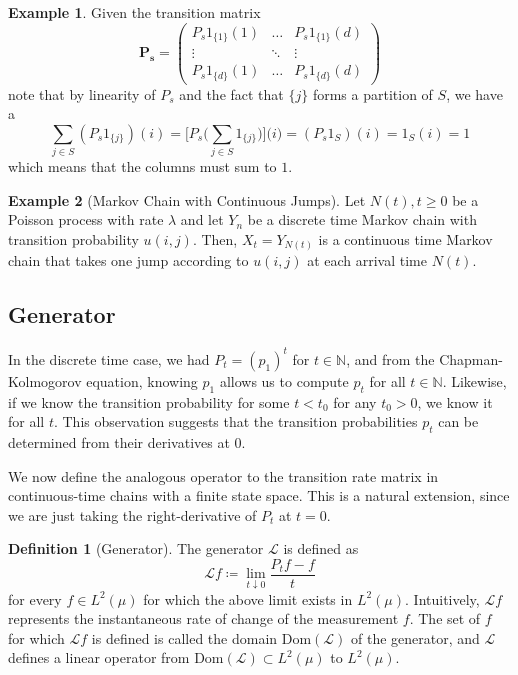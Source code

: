 \documentclass{article}
\theoremstyle{definition}
\newtheorem{example}{Example}[section]
\theoremstyle{remark}
\theoremstyle{definition}
\newtheorem{definition}{Definition}[section]
\begin{document}
\begin{example}
Given the transition matrix 
\[\mathbf{P_s} = \begin{pmatrix} P_s 1_{\{1\}} (1) & \ldots & P_s 1_{\{1\}} (d) \\ \vdots & \ddots & \vdots \\ P_s 1_{\{d\}} (1) & \ldots & P_s 1_{\{d\}} (d) \end{pmatrix}\]
note that by linearity of $P_s$ and the fact that $\{j\}$ forms a partition of $S$, we have a
\[\sum_{j \in S} (P_s 1_{\{j\}}) (i) = \bigg[ P_s \bigg( \sum_{j \in S} 1_{\{j\}} \bigg) \bigg] \big( i \big) = (P_s 1_S) (i) = 1_S (i) = 1\]
which means that the columns must sum to $1$. 
\end{example}

\begin{example}[Markov Chain with Continuous Jumps]
Let $N(t), t \geq 0$ be a Poisson process with rate $\lambda$ and let $Y_n$ be a discrete time Markov chain with transition probability $u(i, j)$. Then, $X_t = Y_{N(t)}$ is a continuous time Markov chain that takes one jump according to $u(i, j)$ at each arrival time $N(t)$. 
\end{example}


\subsection{Generator}

In the discrete time case, we had $P_t = (p_1)^t$ for $t \in \mathbb{N}$, and from the Chapman-Kolmogorov equation, knowing $p_1$ allows us to compute $p_t$ for all $t \in \mathbb{N}$. Likewise, if we know the transition probability for some $t < t_0$ for any $t_0 > 0$, we know it for all $t$. This observation suggests that the transition probabilities $p_t$ can be determined from their derivatives at $0$. 

We now define the analogous operator to the transition rate matrix in continuous-time chains with a finite state space. This is a natural extension, since we are just taking the right-derivative of $P_t$ at $t = 0$. 

\begin{definition}[Generator]
The generator $\mathscr{L}$ is defined as 
\[\mathscr{L} f \coloneqq \lim_{t \downarrow 0} \frac{P_t f - f}{t}\]
for every $f \in L^2 (\mu)$ for which the above limit exists in $L^2 (\mu)$. Intuitively, $\mathscr{L} f$ represents the instantaneous rate of change of the measurement $f$. The set of $f$ for which $\mathscr{L}f$ is defined is called the domain $\mathrm{Dom}(\mathscr{L})$ of the generator, and $\mathscr{L}$ defines a linear operator from $\mathrm{Dom}(\mathscr{L}) \subset L^2 (\mu)$ to $L^2 (\mu)$. 
\end{definition}
\end{document}

